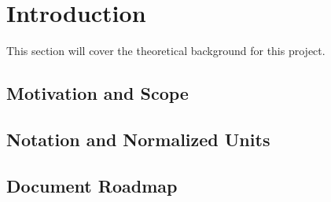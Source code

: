 \newpage
\section{Introduction}
This section will cover the theoretical background for this project.


\subsection{Motivation and Scope}
\subsection{Notation and Normalized Units}
\subsection{Document Roadmap}


